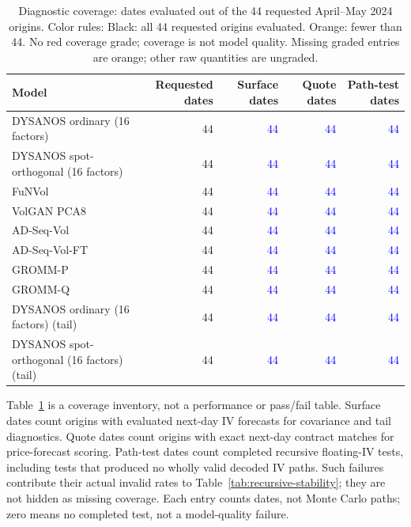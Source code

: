 \documentclass[11pt]{article}
\begin{document}
\begin{table}[H]\centering\small\setlength{\tabcolsep}{4pt}
\caption{Diagnostic coverage: dates evaluated out of the 44 requested April--May 2024 origins. Color rules: Black: all 44 requested origins evaluated. Orange: fewer than 44. No red coverage grade; coverage is not model quality. Missing graded entries are orange; other raw quantities are ungraded.}\label{tab:audit-coverage}
\begin{tabular}{@{}lrrrr@{}}
\toprule
Model & Requested dates & Surface dates & Quote dates & Path-test dates \\
\midrule
DYSANOS ordinary (16 factors) & 44 & \textcolor{blue}{44} & \textcolor{blue}{44} & \textcolor{blue}{44} \\
DYSANOS spot-orthogonal (16 factors) & 44 & \textcolor{blue}{44} & \textcolor{blue}{44} & \textcolor{blue}{44} \\
FuNVol & 44 & \textcolor{blue}{44} & \textcolor{blue}{44} & \textcolor{blue}{44} \\
VolGAN PCA8 & 44 & \textcolor{blue}{44} & \textcolor{blue}{44} & \textcolor{blue}{44} \\
AD-Seq-Vol & 44 & \textcolor{blue}{44} & \textcolor{blue}{44} & \textcolor{blue}{44} \\
AD-Seq-Vol-FT & 44 & \textcolor{blue}{44} & \textcolor{blue}{44} & \textcolor{blue}{44} \\
GROMM-P & 44 & \textcolor{blue}{44} & \textcolor{blue}{44} & \textcolor{blue}{44} \\
GROMM-Q & 44 & \textcolor{blue}{44} & \textcolor{blue}{44} & \textcolor{blue}{44} \\
DYSANOS ordinary (16 factors) (tail) & 44 & \textcolor{blue}{44} & \textcolor{blue}{44} & \textcolor{blue}{44} \\
DYSANOS spot-orthogonal (16 factors) (tail) & 44 & \textcolor{blue}{44} & \textcolor{blue}{44} & \textcolor{blue}{44} \\
\bottomrule\end{tabular}\end{table}

Table~\ref{tab:audit-coverage} is a coverage inventory, not a performance or pass/fail table. Surface dates count origins with evaluated next-day IV forecasts for covariance and tail diagnostics. Quote dates count origins with exact next-day contract matches for price-forecast scoring. Path-test dates count completed recursive floating-IV tests, including tests that produced no wholly valid decoded IV paths. Such failures contribute their actual invalid rates to Table~\ref{tab:recursive-stability}; they are not hidden as missing coverage. Each entry counts dates, not Monte Carlo paths; zero means no completed test, not a model-quality failure.
\end{document}
